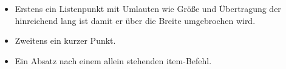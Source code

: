\begin{itemize}
  \item Erstens ein Listenpunkt mit Umlauten wie Größe und Übertragung der hinreichend lang ist
  damit er über die Breite umgebrochen wird.
  \item Zweitens ein kurzer Punkt.
  \item
  Ein Absatz nach einem allein stehenden item-Befehl.
\end{itemize}
